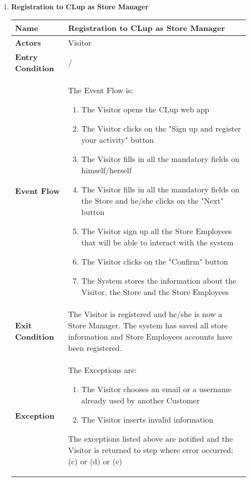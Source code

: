 \begin{enumerate}
            \item \textbf{Registration to CLup as Store Manager}{\renewcommand{\arraystretch}{2}
            \begin{longtable}{|L{4cm}|L{10cm}|}
                \hline
                \textbf{Name} & Registration to CLup as Store Manager \\
                \hline
                \textbf{Actors} & Visitor \\
                \hline
                \textbf{Entry Condition} & / \\
                \hline
                \textbf{Event Flow} & The Event Flow is: \begin{enumerate}
                        \item The Visitor opens the CLup web app
                        \item The Visitor clicks on the "Sign up and register your activity" button
                        \item The Visitor fills in all the mandatory fields on himself/herself
                        \item The Visitor fills in all the mandatory fields on the Store and he/she clicks on the "Next" button
                        \item The Visitor sign up all the Store Employees that will be able to interact with the system
                        \item The Visitor clicks on the "Confirm" button
                        \item The System stores the information about the Visitor, the Store and the Store Employees
                    \end{enumerate} \\
                \hline
                \textbf{Exit Condition} & The Visitor is registered and he/she is now a Store Manager. The system has saved all store information and Store Employees accounts have been registered. \\
                \hline
                \textbf{Exception} & The Exceptions are: \begin{enumerate}
                        \item The Visitor chooses an email or a username already used by another Customer
                        \item The Visitor inserts invalid information
                    \end{enumerate} The exceptions listed above are notified and the Visitor is returned to step where error occurred: (c) or (d) or (e) \\

\end{longtable}}
\end{enumerate}
